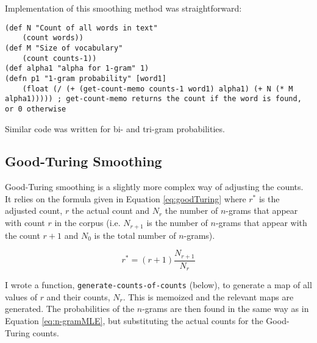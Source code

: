 Implementation of this smoothing method was straightforward:

\begin{lstlisting}
(def N "Count of all words in text" 
	(count words))
(def M "Size of vocabulary" 
	(count counts-1))
(def alpha1 "alpha for 1-gram" 1)
(defn p1 "1-gram probability" [word1] 
	(float (/ (+ (get-count-memo counts-1 word1) alpha1) (+ N (* M alpha1))))) ; get-count-memo returns the count if the word is found, or 0 otherwise
\end{lstlisting}

\noindent Similar code was written for bi- and tri-gram probabilities.

\subsection{Good-Turing Smoothing}

Good-Turing smoothing is a slightly more complex way of adjusting the counts. It relies on the formula given in Equation \ref{eq:goodTuring} where $r^{*}$ is the adjusted count, $r$ the actual count and $N_{r}$ the number of $n$-grams that appear with count $r$ in the corpus (i.e. $N_{r+1}$ is the number of $n$-grams that appear with the count $r+1$ and $N_{0}$ is the total number of $n$-grams).

\begin{equation}
r^{*}=(r+1)\frac{N_{r+1}}{N_{r}}
\label{eq:goodTuring}
\end{equation}


I wrote a function, \lstinline!generate-counts-of-counts! (below), to generate a map of all values of $r$ and their counts, $N_{r}$. This is memoized and the relevant maps are generated. The probabilities of the $n$-grams are then found in the same way as in Equation \ref{eq:n-gramMLE}, but substituting the actual counts for the Good-Turing counts.

